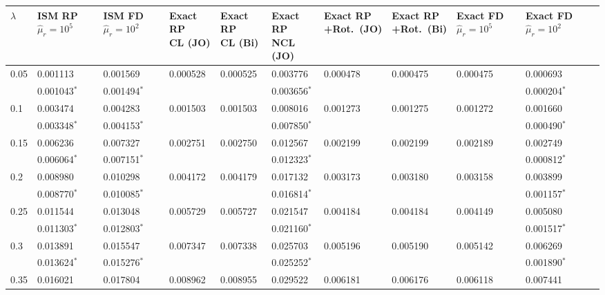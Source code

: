 \documentclass[../thesis.tex]{subfiles}
\begin{document}
\begin{landscape}

\begin{longtable}{lllllllllll}%
\captionsetup{width=1.35\textwidth}
 \hline
 $\lambda$ & \makecell[l]{ISM RP\\$\hat{\mu}_r=10^5$} & \makecell[l]{ISM FD\\$\hat{\mu}_r=10^2$} & \makecell[l]{Exact RP\\CL (JO)} & \makecell[l]{Exact RP\\CL (Bi)} & \makecell[l]{Exact RP\\NCL (JO)} & \makecell[l]{Exact RP\\+Rot.\ (JO)} & \makecell[l]{Exact RP\\+Rot.\ (Bi)} & \makecell[l]{Exact FD\\$\hat{\mu}_r=10^5$} & \makecell[l]{Exact FD\\$\hat{\mu}_r=10^2$}
 \\\hline
 0.05 & 0.001113 & 0.001569 & 0.000528 & 0.000525 & 0.003776 & 0.000478 & 0.000475 & 0.000475 & 0.000693
 \\
 & 0.001043$^*$ & 0.001494$^*$ & & & 0.003656$^*$ & & & & 0.000204$^*$
 \\
 0.1 & 0.003474 & 0.004283 & 0.001503 & 0.001503 & 0.008016 & 0.001273 & 0.001275 & 0.001272 & 0.001660
 \\
 & 0.003348$^*$ & 0.004153$^*$ & & & 0.007850$^*$ & & & & 0.000490$^*$
 \\
 0.15 & 0.006236 & 0.007327 & 0.002751 & 0.002750 & 0.012567 & 0.002199 & 0.002199 & 0.002189 & 0.002749
 \\
 & 0.006064$^*$ & 0.007151$^*$ & & & 0.012323$^*$ & & & & 0.000812$^*$
 \\
 0.2 & 0.008980 & 0.010298 & 0.004172 & 0.004179 & 0.017132 & 0.003173 & 0.003180 & 0.003158 & 0.003899
 \\
 & 0.008770$^*$ & 0.010085$^*$ & & & 0.016814$^*$ & & & & 0.001157$^*$
 \\
 0.25 & 0.011544 & 0.013048 & 0.005729 & 0.005727 & 0.021547 & 0.004184 & 0.004184 & 0.004149 & 0.005080
 \\
 & 0.011303$^*$ & 0.012803$^*$ & & & 0.021160$^*$ & & & & 0.001517$^*$
 \\
 0.3 & 0.013891 & 0.015547 & 0.007347 & 0.007338 & 0.025703 & 0.005196 & 0.005190 & 0.005142 & 0.006269
 \\
 & 0.013624$^*$ & 0.015276$^*$ & & & 0.025252$^*$ & & & & 0.001890$^*$
 \\
 0.35 & 0.016021 & 0.017804 & 0.008962 & 0.008955 & 0.029522 & 0.006181 & 0.006176 & 0.006118 & 0.007441

\end{longtable}
\end{landscape}
\end{document}
